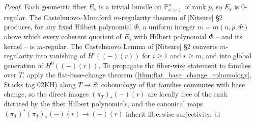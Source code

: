 \begin{proof}
  
  Each geometric fiber \(E_s\) is a trivial bundle on \(\mathbb{P}^n_{\kappa(s)}\)
  of rank \(p\), so \(E_s\) is \(0\)-regular. The Castelnuovo--Mumford
  \(m\)-regularity theorem of [Nitsure] \S 2 produces, for any fixed Hilbert
  polynomial \(\Phi\), a uniform integer \(m = m(n, p, \Phi)\) above which
  every coherent quotient of \(E_s\) with Hilbert polynomial \(\Phi\) -- and
  its kernel -- is \(m\)-regular. The Castelnuovo Lemma of [Nitsure] \S 2
  converts \(m\)-regularity into vanishing of \(H^i((-) (r))\) for \(i \ge 1\)
  and \(r \ge m\), and into global generation of \(H^0((-)(r))\). To
  propagate the fiber-wise statement to families over \(T\), apply the
  flat-base-change theorem (\cref{thm:flat_base_change_cohomology}, Stacks
  tag 02KH) along \(T \to S\): cohomology of flat families commutes with
  base change, so the direct images \((\pi_T)_*(-)(r)\) are locally free of
  the rank dictated by the fiber Hilbert polynomials, and the canonical
  maps \((\pi_T)^* (\pi_T)_*(-)(r) \to (-)(r)\) inherit fiberwise
  surjectivity.
\end{proof}

